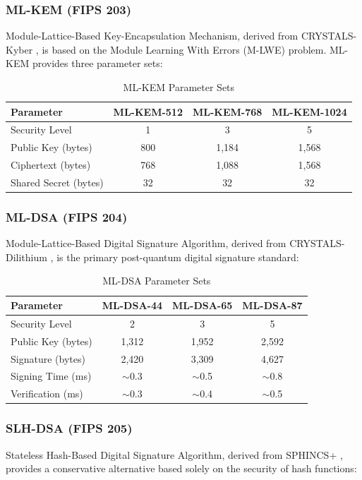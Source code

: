 \documentclass[12pt, a4paper, twocolumn]{article}
\begin{document}
\subsubsection{ML-KEM (FIPS 203)}
Module-Lattice-Based Key-Encapsulation Mechanism, derived from CRYSTALS-Kyber \cite{bos2018crystals}, is based on the Module Learning With Errors (M-LWE) problem. ML-KEM provides three parameter sets:

\begin{table}[H]
\centering
\caption{ML-KEM Parameter Sets}
\label{tab:mlkem}
\begin{tabular}{lccc}
\toprule
\textbf{Parameter} & \textbf{ML-KEM-512} & \textbf{ML-KEM-768} & \textbf{ML-KEM-1024} \\
\midrule
Security Level & 1 & 3 & 5 \\
Public Key (bytes) & 800 & 1,184 & 1,568 \\
Ciphertext (bytes) & 768 & 1,088 & 1,568 \\
Shared Secret (bytes) & 32 & 32 & 32 \\
\bottomrule
\end{tabular}
\end{table}

\subsubsection{ML-DSA (FIPS 204)}
Module-Lattice-Based Digital Signature Algorithm, derived from CRYSTALS-Dilithium \cite{ducas2018crystals}, is the primary post-quantum digital signature standard:

\begin{table}[H]
\centering
\caption{ML-DSA Parameter Sets}
\label{tab:mldsa}
\begin{tabular}{lccc}
\toprule
\textbf{Parameter} & \textbf{ML-DSA-44} & \textbf{ML-DSA-65} & \textbf{ML-DSA-87} \\
\midrule
Security Level & 2 & 3 & 5 \\
Public Key (bytes) & 1,312 & 1,952 & 2,592 \\
Signature (bytes) & 2,420 & 3,309 & 4,627 \\
Signing Time (ms) & $\sim$0.3 & $\sim$0.5 & $\sim$0.8 \\
Verification (ms) & $\sim$0.3 & $\sim$0.4 & $\sim$0.5 \\
\bottomrule
\end{tabular}
\end{table}

\subsubsection{SLH-DSA (FIPS 205)}
Stateless Hash-Based Digital Signature Algorithm, derived from SPHINCS+ \cite{bernstein2019sphincs}, provides a conservative alternative based solely on the security of hash functions:
\end{document}

